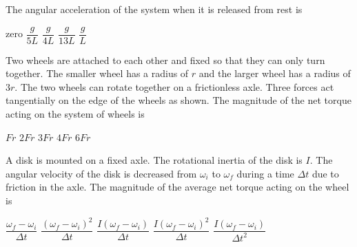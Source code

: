\documentclass{../../../oss-classkick-exam}
\begin{document}
\begin{multicols*}{2}
\begin{questions}
    \question The angular acceleration of the system when it is released from
    rest is
    \label{lightrod2}
    \begin{choices}
      \choice zero
      \choice $\dfrac{g}{5L}$
      \choice $\dfrac{g}{4L}$
      \choice $\dfrac{g}{13L}$
      \choice $\dfrac{g}L$
    \end{choices}

    \question Two wheels are attached to each other and fixed so that they can
    only turn together. The smaller wheel has a radius of $r$ and the larger
    wheel has a radius of $3r$. The two wheels can rotate together on a
    frictionless axle. Three forces act tangentially on the edge of the wheels
    as shown. The magnitude of the net torque acting on the system of wheels is
    \begin{center}
    \end{center}
    \begin{choices}
      \choice $Fr$
      \choice $2Fr$
      \choice $3Fr$
      \choice $4Fr$
      \choice $6Fr$
    \end{choices}
    \columnbreak

    \question A disk is mounted on a fixed axle. The rotational inertia of the
    disk is $I$. The angular velocity of the disk is decreased from $\omega_i$
    to $\omega_f$ during a time $\Delta t$ due to friction in the axle. The
    magnitude of the average net torque acting on the wheel is
    \begin{choices}
      \choice $\dfrac{\omega_f-\omega_i}{\Delta t}$
      \choice $\dfrac{(\omega_f-\omega_i)^2}{\Delta t}$
      \choice $\dfrac{I(\omega_f-\omega_i)}{\Delta t}$
      \choice $\dfrac{I(\omega_f-\omega_i)^2}{\Delta t}$
      \choice $\dfrac{I(\omega_f-\omega_i)}{\Delta t^2}$
    \end{choices}
    \vspace{.7in}
    

\end{questions}
\end{multicols*}
\end{document}
